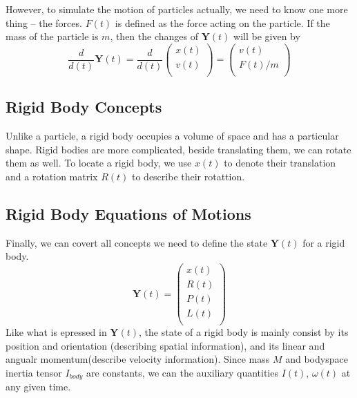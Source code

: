 However, to simulate the motion of particles actually, we need to know one more thing -- the forces. $F(t)$ is defined as the force acting on the particle. If the mass of the particle is $m$, then the changes of $\textbf{Y}(t)$ will be given by
\begin{equation}
    \frac{d}{d(t)}\textbf{Y}(t) = \frac{d}{d(t)}\left(
        \begin{array}{c}
            x(t) \\
            v(t) \\
        \end{array} \right) = \left(
        \begin{array}{c}
            v(t) \\
            F(t)/m \\
        \end{array} \right)
\end{equation}

\subsection{Rigid Body Concepts}
Unlike a particle, a rigid body occupies a volume of space and has a particular shape. Rigid bodies are more complicated, beside translating them, we can rotate them as well. To locate a rigid body, we use $x(t)$ to denote their translation and a rotation matrix $R(t)$ to describe their rotattion.

\subsection{Rigid Body Equations of Motions}
Finally, we can covert all concepts we need to define the state $\textbf{Y}(t)$ for a rigid body.
\begin{equation}
    \textbf{Y}(t) = \left(
        \begin{array}{c}
            x(t) \\
            R(t) \\
            P(t) \\
            L(t) \\
        \end{array}
    \right)
\end{equation}
Like what is epressed in $\textbf{Y}(t)$, the state of a rigid body is mainly consist by its position and orientation (describing spatial information), and its linear and angualr momentum(describe velocity information). Since mass $M$ and bodyspace inertia tensor $I_{body}$ are constants, we can the auxiliary quantities $I(t)$, $\omega(t)$ at any given time.

